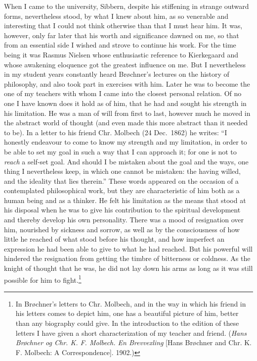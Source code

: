 \documentclass[12pt,a4paper]{book}
\newcommand{\opage}[1]{\marginnote{\footnotesize\textit{[#1]}}}
\begin{document}
When I came to the university, Sibbern, despite his stiffening in strange outward forms,
nevertheless stood, by what I knew about him, as so venerable and interesting that I could not
think otherwise than that I must hear him. It was, however, only far later that his worth and
significance dawned on me, so that from an essential side I wished and strove to continue his
work. For the time being it was Rasmus Nielsen whose enthusiastic reference to Kierkegaard and
whose awakening eloquence got the greatest influence on me. But I nevertheless in my student
years constantly heard Brøchner's lectures on the history of philosophy, and also took part in
exercises with him. Later he was to become the one of my teachers with whom I came into the
closest personal relation. Of no one I have known does it hold as of him, that he had and
sought his strength in his limitation. He was a man of will from first to last, however much he
moved in the abstract world of thought (and even made this more abstract than it needed to be).
In a letter to his friend Chr. Molbech (24 Dec.\ 1862) he writes: ``I honestly endeavour to
come to know my strength and my limitation, in order to be able to set \opage{197}my goal in such a way
that I can approach it; for one is not to \emph{reach} a self-set goal. And should I be
mistaken about the goal and the ways, one thing I nevertheless keep, in which one cannot be
mistaken: the having willed, and the ideality that lies therein.'' These words appeared on the
occasion of a contemplated philosophical work, but they are characteristic of him both as a
human being and as a thinker. He felt his limitation as the means that stood at his disposal
when he was to give his contribution to the spiritual development and thereby develop his own
personality. There was a mood of resignation over him, nourished by sickness and sorrow, as
well as by the consciousness of how little he reached of what stood before his thought, and how
imperfect an expression he had been able to give to what he had reached. But his powerful will
hindered the resignation from getting the timbre of bitterness or coldness. As the knight of
thought that he was, he did not lay down his arms as long as it was still possible for him to
fight.\footnote{In Brøchner's letters to Chr. Molbech, and in the way in which his friend in his
letters comes to depict him, one has a beautiful picture of him, better than any biography could
give. In the introduction to the edition of these letters I have given a short characterization
of my teacher and friend. (\emph{Hans Brøchner og Chr. K. F. Molbech. En Brevvexling} [Hans
Brøchner and Chr. K. F. Molbech: A Correspondence]. 1902.)}
\end{document}
